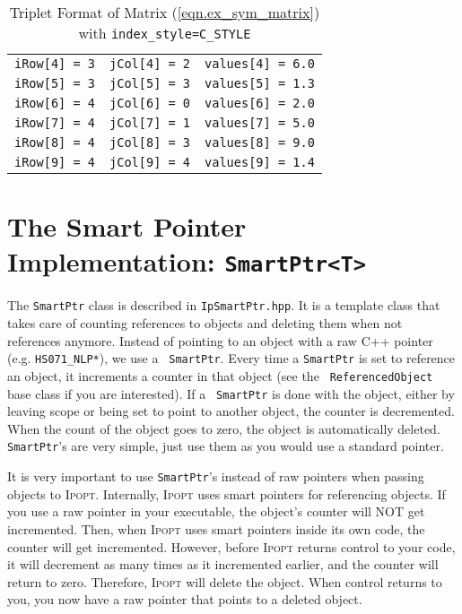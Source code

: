 \documentclass[10pt]{article}
\newcommand{\Ipopt}{\textsc{Ipopt}\xspace}
\begin{document}
\begin{footnotesize}
\begin{table}[ht]
\begin{center}
\begin{tabular}{c c c}
{\tt iRow[4] = 3}       &       {\tt jCol[4] = 2}       & {\tt values[4] = 6.0}     \\
{\tt iRow[5] = 3}       &       {\tt jCol[5] = 3}       & {\tt values[5] = 1.3}     \\
{\tt iRow[6] = 4}       &       {\tt jCol[6] = 0}       & {\tt values[6] = 2.0}     \\
{\tt iRow[7] = 4}       &       {\tt jCol[7] = 1}       & {\tt values[7] = 5.0}     \\
{\tt iRow[8] = 4}       &       {\tt jCol[8] = 3}       & {\tt values[8] = 9.0}     \\
{\tt iRow[9] = 4}       &       {\tt jCol[9] = 4}       & {\tt values[9] = 1.4}
\end{tabular}
\caption{Triplet Format of Matrix (\ref{eqn.ex_sym_matrix}) 
with {\tt index\_style=C\_STYLE}}
\label{tab.sym_c_triplet}
\end{center}
\end{table}
\end{footnotesize}


\section{The Smart Pointer Implementation: {\tt SmartPtr<T>}} \label{app.smart_ptr}

The {\tt SmartPtr} class is described in {\tt IpSmartPtr.hpp}. It is a
template class that takes care of counting references to objects and
deleting them when not references anymore. Instead of pointing to an object
with a raw C++ pointer (e.g. {\tt HS071\_NLP*}), we use a {\tt
  SmartPtr}.  Every time a {\tt SmartPtr} is set to reference an
object, it increments a counter in that object (see the {\tt
  ReferencedObject} base class if you are interested). If a {\tt
  SmartPtr} is done with the object, either by leaving scope or being
set to point to another object, the counter is decremented. When the
count of the object goes to zero, the object is automatically deleted.
{\tt SmartPtr}'s are very simple, just use them as you would use a
standard pointer.

It is very important to use {\tt SmartPtr}'s instead of raw pointers
when passing objects to \Ipopt. Internally, \Ipopt uses smart
pointers for referencing objects. If you use a raw pointer in your
executable, the object's counter will NOT get incremented. Then, when
\Ipopt uses smart pointers inside its own code, the counter will get
incremented. However, before \Ipopt returns control to your code, it
will decrement as many times as it incremented earlier, and the
counter will return to zero. Therefore, \Ipopt will delete the
object. When control returns to you, you now have a raw pointer that
points to a deleted object.
\end{document}
